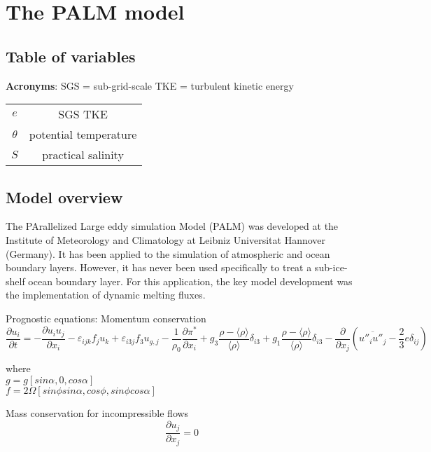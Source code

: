 \documentclass[letterpaper,10pt]{report}
\begin{document}
\chapter{The PALM model}
    \section{Table of variables}
    
    \textbf{Acronyms}:
    SGS = sub-grid-scale
    TKE = turbulent kinetic energy
    
    \begin{tabular}{c|c}
       $e$      & SGS TKE \\
       $\theta$ & potential temperature \\
       $S$      & practical salinity
    \end{tabular}
	\section{Model overview}
	
	The PArallelized Large eddy simulation Model (PALM) was developed at the Institute of Meteorology and Climatology at Leibniz Universitat Hannover (Germany). It has been applied to the simulation of atmospheric and ocean boundary layers. However, it has never been used specifically to treat a sub-ice-shelf ocean boundary layer. For this application, the key model development was the implementation of dynamic melting fluxes. 
	
	Prognostic equations:
	Momentum conservation
	\begin{equation} \label{eq:uprog}
	\frac{\partial u_i}{\partial t} = 
	-\frac{\partial u_i u_j}{\partial x_i}
	-\varepsilon_{ijk} f_j u_k 
	+ \varepsilon_{i3j} f_3 u_{g,j} 
	- \frac{1}{\rho_0}\frac{\partial \pi^*}{\partial x_i} 
	+ g_3 \frac{\rho - \langle \rho \rangle}{\langle \rho \rangle}\delta_{i3} 
	+ g_1 \frac{\rho - \langle \rho \rangle}{\langle \rho \rangle}\delta_{i3} 
	- \frac{\partial}{\partial x_j}(\overline{u''_i u''_j} - \frac{2}{3}e\delta_{ij})
	\end{equation}
	
	where \\
	$g = g [sin \alpha,0,cos \alpha]$\\
	$f = 2 \Omega [sin \phi sin \alpha,cos \phi,sin \phi cos \alpha]$
	
	Mass conservation for incompressible flows
	\begin{equation} \label{eq:volconserv}
	\frac{\partial u_j}{\partial x_j} = 0
	\end{equation}
	
\end{document}

